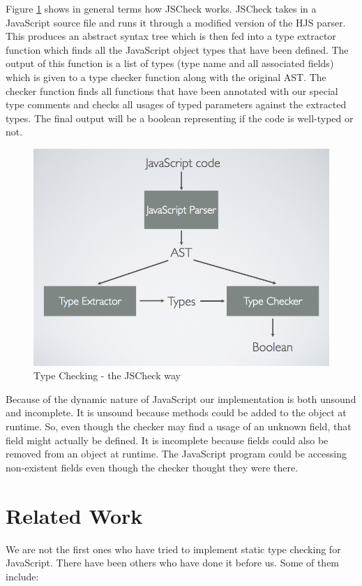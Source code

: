 \documentclass{article}
\begin{document}
Figure \ref{fig:jscheckway} shows in general terms how JSCheck works. JSCheck takes 
in a JavaScript source file and runs
it through a modified version of the HJS parser. This produces an abstract syntax tree
which is then fed into a type extractor function which finds all the JavaScript 
object types that
have been defined. The output of this function is a list of types 
(type name and all associated fields)
which is given to a type checker function along with the original AST. The
checker function finds all functions that have been annotated with our special
type comments and checks all usages of typed parameters against the extracted types.
The final 
output will be a boolean representing if the code is well-typed or not. 

\begin{figure}[here]
  \begin{center}
    \includegraphics[scale=0.4]{blockdiagram.png}
  \end{center}
  \caption{Type Checking - the JSCheck way}
  \label{fig:jscheckway}
\end{figure}
\pagebreak

Because of the dynamic nature of JavaScript our implementation is both unsound 
and incomplete. It is unsound because methods could be added to the object at
runtime. So, even though the checker may find a usage of an unknown field, that field
might actually be defined. It is incomplete because fields could also be removed
from an object at runtime. The JavaScript program could be accessing non-existent 
fields even though the checker thought they were there.


\section{Related Work}
\label{sec:related}
We are not the first ones who have tried to implement static type checking for JavaScript.
There have been others who have done it before us. Some of them include:
\end{document}
